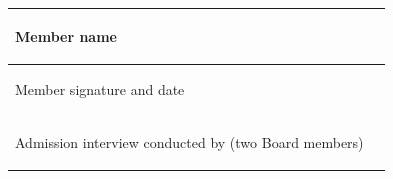 \documentclass{../../../Common/Latex/Templates/rapport}
\begin{document}
\begin{tabularx}{\textwidth}{|>{\bfseries\raggedright\arraybackslash}p{5cm}|X|}
  \hline
  Member name                                          & \rule{0pt}{1cm}   \\
  \hline
  Member signature and date                            & \rule{0pt}{1.4cm} \\
  \hline
  Admission interview conducted by (two Board members) & \rule{0pt}{1.4cm} \\
  \hline
\end{tabularx}
\end{document}
